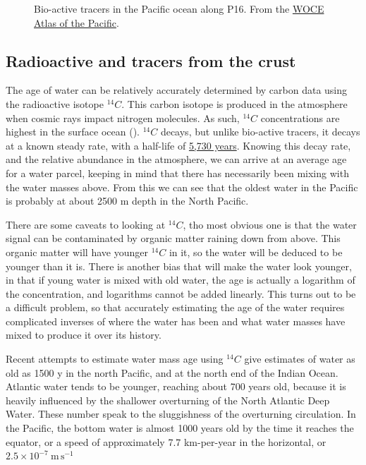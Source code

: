 \begin{figure}[hbt]
\begin{center}
    \caption{Bio-active tracers in the Pacific ocean along P16.  From the \href{http://whp-atlas.ucsd.edu/pacific_index.html}{WOCE Atlas of the Pacific}. }
    \label{fig:P16BioActive}  
  \end{center}
\end{figure}
\clearpage
\subsection{Radioactive and tracers from the crust}

The age of water can be relatively accurately determined by carbon data using the radioactive isotope $^{14}C$. This carbon isotope is produced in the atmosphere when cosmic rays impact nitrogen molecules.  As such, $^{14}C$ concentrations are highest in the surface ocean ().  $^{14}C$ decays, but unlike bio-active tracers, it decays at a known steady rate, with a half-life of \href{https://en.wikipedia.org/wiki/Carbon-14}{5,730 years}.  Knowing this decay rate, and the relative abundance in the atmosphere, we can arrive at an average age for a water parcel, keeping in mind that there has necessarily been mixing with the water masses above.  From this we can see that the oldest water in the Pacific is probably at about 2500 m depth in the North Pacific. 

There are some caveats to looking at $^{14}C$, tho most obvious one is that the water signal can be contaminated by organic matter raining down from above.  This organic matter will have younger $^{14}C$ in it, so the water will be deduced to be younger than it is.  There is another bias that will make the water look younger, in that if young water is mixed with old water, the age is actually a logarithm of the concentration, and logarithms cannot be added linearly.  This turns out to be a difficult problem, so that accurately estimating the age of the water requires complicated inverses of where the water has been and what water masses have mixed to produce it over its history.  


Recent attempts to estimate water mass age using $^{14}C$ give estimates of water as old as 1500 y in the north Pacific, and at the north end of the Indian Ocean.  Atlantic water tends to be younger, reaching about 700 years old, because it is heavily influenced by the shallower overturning of the North Atlantic Deep Water.  These number speak to the sluggishness of the overturning circulation.  In the Pacific, the bottom water is almost 1000 years old by the time it reaches the equator, or a speed of approximately 7.7 km-per-year in the horizontal, or 
$2.5\times 10^{-7}\ \mathrm{m\,s^{-1}}$ 

